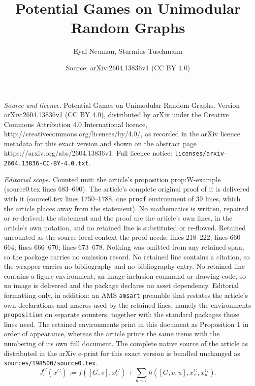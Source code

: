 \documentclass[10pt,a4paper]{amsart}
\title{Potential Games on Unimodular Random Graphs}
\author{Eyal Neuman, Sturmius Tuschmann}
\date{Source: arXiv:2604.13836v1 (CC BY 4.0)}
\begin{document}
\maketitle

\noindent\emph{Source and licence.} Potential Games on Unimodular Random Graphs. Version arXiv:2604.13836v1 (CC BY 4.0), distributed by arXiv under the Creative Commons Attribution 4.0 International licence, http://creativecommons.org/licenses/by/4.0/, as recorded in the arXiv licence metadata for this exact version and shown on the abstract page https://arxiv.org/abs/2604.13836v1. Full licence notice: \texttt{licenses/arxiv-2604.13836-CC-BY-4.0.txt}.\par\smallskip

\noindent\textit{Editorial scope.} Counted unit: the article's proposition prop:W-example (source0.tex lines 683--690). The article's complete original proof of it is delivered with it (source0.tex lines 1750--1788, one \texttt{proof} environment of 39 lines, which the article places away from the statement). No mathematics is written, repaired or re-derived: the statement and the proof are the article's own lines, in the article's own notation, and no retained line is substituted or re-flowed.  Retained uncounted as the source-local context the proof needs: lines 218--222; lines 660--664; lines 666--670; lines 673--678.  Nothing was omitted from any retained span, so the package carries no omission record.  No retained line contains a citation, so the wrapper carries no bibliography and no bibliography entry.  No retained line contains a figure environment, an image-inclusion command or drawing code, so no image is delivered and the package declares no asset dependency.  Editorial formatting only, in addition: an AMS \texttt{amsart} preamble that restates the article's own declarations and macros used by the retained lines, namely the environments \texttt{proposition} on separate counters, together with the standard packages those lines need.  The retained environments print in this document as Proposition 1 in order of appearance, whereas the article prints the same items with the numbering of its own full document.  The complete native source of the article as distributed in the arXiv e-print for this exact version is bundled unchanged as \texttt{sources/198500/source0.tex}.
\begin{equation} \label{eq:J}
J_v^G(x^G)
:=
f([G,v],x^G_v)+\sum_{u\sim v} h([G,v,u],x^G_v,x^G_u).
\end{equation}
\end{document}
